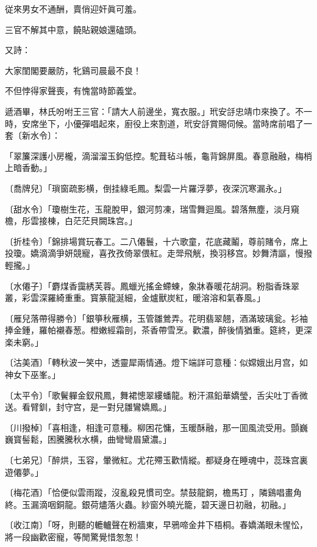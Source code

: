 \begin{myquote}
従來男女不通酬，賣俏迎奸眞可羞。

三官不解其中意，饒貼親娘還磕頭。
\end{myquote}

又詩：

\begin{myquote}
大家閨閣要嚴防，牝鷄司晨最不良！

不但悖得家聲喪，有愧當時節義堂。
\end{myquote}

遞酒畢，林氏吩咐王三官：「請大人前邊坐，寬衣服。」玳安㧱忠靖巾來換了。不一時，安席坐下，小優彈唱起來，廚役上來割道，玳安㧱賞賜伺候。當時席前唱了一套〔新水令〕：

\begin{myquote}
「翠簾深護小房櫳，滴溜溜玉鈎低控。駝葺毡斗帳，龜背錦屏風。春意融融，梅梢上暗香動。」

{\markfont〔喬牌兒〕}「瑣窗疏影横，倒挂綠毛鳳。梨雲一片羅浮夢，夜深沉寒漏永。」

{\markfont〔甜水令〕}「瓊樹生花，玉龍脫甲，銀河剪凍，瑞雪舞迴風。碧落無塵，淡月窺檐，彤雲接棟，白茫茫貝闕珠宫。」

{\markfont〔折桂令〕}「錦排場賞玩春工。二八僊鬟，十六歌童，花底藏鬮，尊前賭令，席上投瓊。嬌滴滴爭妍競寵，喜孜孜倚翠偎紅。走斝飛觥，換羽移宫。妙舞清謳，慢撥輕攏。」

{\markfont〔水僊子〕}「麝煤香靄綉芙蓉。鳳蠟光搖金螮蝀，象牀春暖花胡洞。粉脂香珠翠叢，彩雲深羅綺重重。寳篆龍涎細，金爐獸炭紅，暖溶溶和氣春風。」

{\markfont〔雁兒落帶得勝令〕}「銀箏秋雁横，玉管雛鶯弄。花明翡翠翹，酒滿玻璃瓮。衫袖捧金鍾，羅帕襯春葱。橙嫩經霜剖，茶香帶雪烹。歡濃，醉後情猶重。筵終，更深楽未窮。」

{\markfont〔沽美酒〕}「轉秋波一笑中，透靈犀兩情通。燈下端詳可意種：似嫦娥出月宫，如神女下巫峯。」

{\markfont〔太平令〕}「歌鬢軃金釵飛鳳，舞裙憁翠縷蟠龍。粉汗濕鉛華嬌瑩，舌尖吐丁香微送。看臂釧，封守宫，是一對兒雛鸞嬌鳳。」

{\markfont〔川撥棹〕}「喜相逢，相逢可意種。柳困花慵，玉暖酥融，那一囬風流受用。顫巍巍寳髻鬆，困騰騰秋水横，曲彎彎眉黛濃。」

{\markfont〔七弟兄〕}「醉烘，玉容，暈微紅。尤花殢玉歡情縱。都疑身在睡魂中，蕊珠宫裏遊僊夢。」

{\markfont〔梅花酒〕}「恰便似雲雨蹤，沒亂殺見慣司空。禁鼓龍銅，檐馬玎𤦪，隣鷄唱畫角終。玉漏滴咽銅龍。銀荷燼落火蟲。紗窗外曉光籠，碧天邊日初融，初融。」

{\markfont〔收江南〕}「呀，則聽的轆轤聲在粉牆東，早鴉啼金井下梧桐。春嬌滿眼未惺忪，將一段幽歡密寵，等閒驚覺惜怱怱！
\end{myquote}


